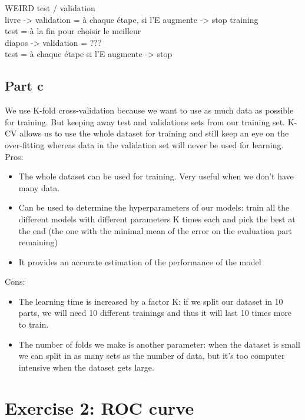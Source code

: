 \documentclass[a4paper, 10pt]{article}
\begin{document}
WEIRD test / validation
\\
livre ->    validation = à chaque étape, si l'E augmente -> stop training
\\          test = à la fin pour choisir le meilleur
\\
diapos ->   validation = ???
\\          test = à chaque étape si l'E augmente -> stop

\subsection{Part c}
We use K-fold cross-validation because we want to use as much data as possible for training.
But keeping away test and validations sets from our training set. K-CV allows us to use the whole
dataset for training and still keep an eye on the over-fitting whereas data in the validation set will never
be used for learning.
\\
Pros: 
\begin{itemize}
    \item The whole dataset can be used for training. Very useful when we don't have many data.
    \item Can be used to determine the hyperparameters of our models: train all the
    different models with different parameters K times each and pick the best at the end
    (the one with the minimal mean of the error on the evaluation part remaining)
    \item It provides an accurate estimation of the performance of the model
\end{itemize}
Cons:
\begin{itemize}
    \item The learning time is increased by a factor K: if we split our dataset in 10 parts, we 
    will need 10 different trainings and thus it will last 10 times more to train.
    \item The number of folds we make is another parameter: when the dataset is small we can split in
    as many sets as the number of data, but it's too computer intensive when the dataset gets large.
\end{itemize}
\section{Exercise 2: ROC curve}
\end{document}
